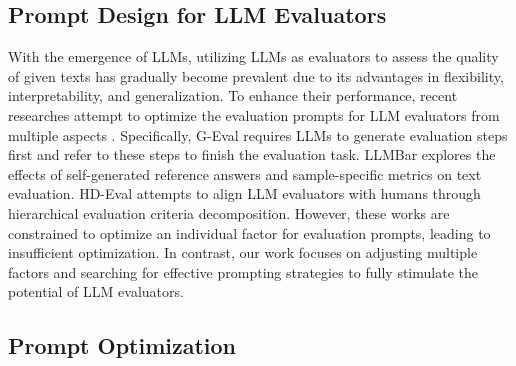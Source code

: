 \subsection{Prompt Design for LLM Evaluators}
With the emergence of LLMs, utilizing LLMs as evaluators to assess the quality of given texts has gradually become prevalent \cite{wang-etal-2023-chatgpt, chen-etal-2023-exploring-use, ke-etal-2023-decompeval} due to its advantages in flexibility, interpretability, and generalization.
To enhance their performance, 
recent researches attempt to optimize the evaluation prompts for LLM evaluators from multiple aspects
\cite{stureborg2024large, kim-etal-2023-better, jain-etal-2023-multi, murugadoss2024evaluating, he-etal-2024-socreval, pereira2024check}. 
Specifically, G-Eval \cite{liu-etal-2023-g} requires LLMs to generate evaluation steps first and refer to these steps to finish the evaluation task. 
LLMBar \cite{zeng2024llmbar} explores the effects of self-generated reference answers and sample-specific metrics on text evaluation. 
HD-Eval \cite{liu-etal-2024-hd} attempts to align LLM evaluators with humans through hierarchical evaluation criteria decomposition.
However, these works are constrained to optimize an individual factor for evaluation prompts, leading to insufficient optimization. In contrast, our work focuses on adjusting multiple factors and searching for effective prompting strategies to fully stimulate the potential of LLM evaluators.


\subsection{Prompt Optimization}



